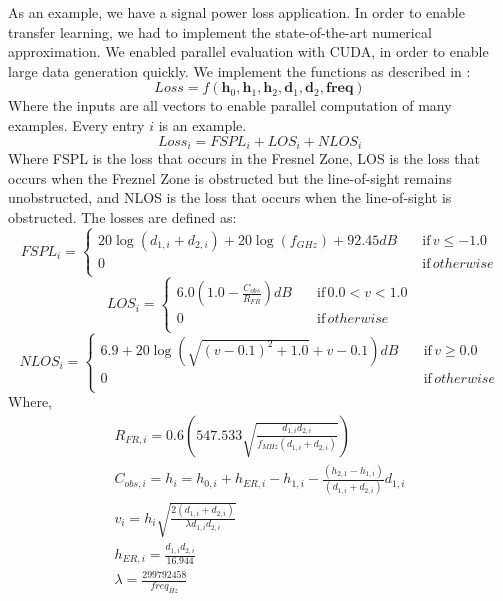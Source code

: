 \documentclass[]{article}
\begin{document}
As an example, we have a signal power loss application.  In order to enable transfer learning, we had to implement the state-of-the-art numerical approximation.  We enabled parallel evaluation with CUDA, in order to enable large data generation quickly.  We implement the functions as described in \cite{Nicole_SigProp}:
\begin{equation}
Loss = f(\textbf{h}_0, \textbf{h}_1, \textbf{h}_2, \textbf{d}_1, \textbf{d}_2, \textbf{freq})
\end{equation}
Where the inputs are all vectors to enable parallel computation of many examples.  Every entry $i$ is an example.
\begin{equation}
Loss_i = FSPL_i + LOS_i + NLOS_i
\end{equation}
Where FSPL is the loss that occurs in the Fresnel Zone, LOS is the loss that occurs when the Freznel Zone is obstructed but the line-of-sight remains unobstructed, and NLOS is the loss that occurs when the line-of-sight is obstructed.  The losses are defined as:
\begin{equation*}
	FSPL_i =\begin{cases}
		20\log(d_{1,i} + d_{2,i}) + 20\log(f_{GHz}) + 92.45dB \quad &\text{if} \, v\le-1.0 \\
		0 \quad &\text{if} \, otherwise \\
	\end{cases}
\end{equation*}
\begin{equation*}
	LOS_i =\begin{cases}
		6.0(1.0 - \frac{C_{obs}}{R_{FR}})dB \quad &\text{if} \, 0.0 < v < 1.0 \\
		0 \quad &\text{if} \, otherwise \\
	\end{cases}
\end{equation*}
\begin{equation*}
	NLOS_i =\begin{cases}
		6.9 + 20\log(\sqrt{(v-0.1)^2 + 1.0} + v -0.1)dB \quad &\text{if} \, v \ge 0.0 \\
		0 \quad &\text{if} \, otherwise \\
	\end{cases}
\end{equation*}
Where,
\begin{gather}
R_{FR,i} = 0.6(547.533\sqrt{\frac{d_{1,i}d_{2,i}}{f_{MHz}(d_{1,i} + d_{2,i})}})\\
C_{obs,i} = h_i = h_{0,i} + h_{ER,i} - h_{1,i} - \frac{(h_{2,1} - h_{1,i})}{(d_{1,i} + d_{2,i})}d_{1,i}\\
v_i = h_i\sqrt{\frac{2(d_{1,i} + d_{2,i})}{\lambda d_{1,i}d_{2,i}}}\\
h_{ER,i} = \frac{d_{1,i}d_{2,i}}{16.944}\\
\lambda = \frac{299792458}{freq_{Hz}}
\end{gather}
\end{document}
